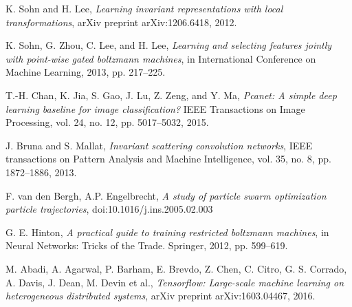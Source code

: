 \documentclass[conference]{IEEEtran}
\begin{document}
\begin{thebibliography}{}
K. Sohn and H. Lee, \emph{Learning invariant representations with local transformations}, arXiv preprint arXiv:1206.6418, 2012. 

K. Sohn, G. Zhou, C. Lee, and H. Lee, \emph{Learning and selecting features jointly with point-wise gated boltzmann machines}, in International Conference on Machine Learning, 2013, pp. 217–225. 

T.-H. Chan, K. Jia, S. Gao, J. Lu, Z. Zeng, and Y. Ma, \emph{Pcanet: A simple deep learning baseline for image classiﬁcation?} IEEE Transactions on Image Processing, vol. 24, no. 12, pp. 5017–5032, 2015. 

J. Bruna and S. Mallat, \emph{Invariant scattering convolution networks}, IEEE transactions on Pattern Analysis and Machine Intelligence, vol. 35, no. 8, pp. 1872–1886, 2013. 

F. van den Bergh, A.P. Engelbrecht, \emph{A study of particle swarm optimization particle trajectories}, doi:10.1016/j.ins.2005.02.003

G. E. Hinton, \emph{A practical guide to training restricted boltzmann machines}, in Neural Networks: Tricks of the Trade. Springer, 2012, pp. 599–619.

M. Abadi, A. Agarwal, P. Barham, E. Brevdo, Z. Chen, C. Citro, G. S. Corrado, A. Davis, J. Dean, M. Devin et al., \emph{Tensorﬂow: Large-scale machine learning on heterogeneous distributed systems}, arXiv preprint arXiv:1603.04467, 2016. 

\end{thebibliography}




\end{document}
